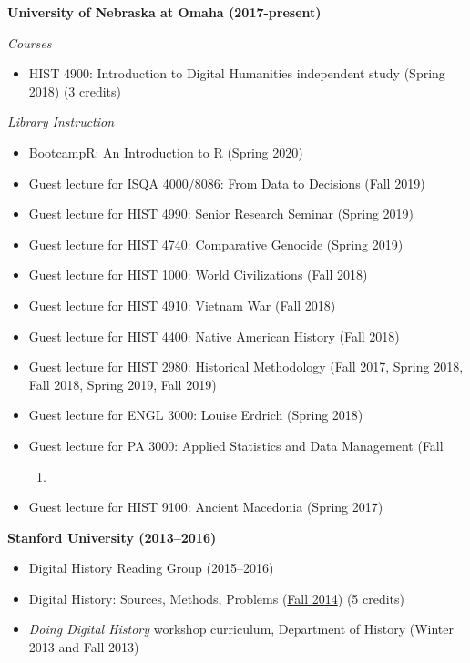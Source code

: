 \textbf{University of Nebraska at Omaha (2017-present)}

\emph{Courses}

\begin{itemize}
\tightlist
\item
  HIST 4900: Introduction to Digital Humanities independent study
  (Spring 2018) (3 credits)
\end{itemize}

\emph{Library Instruction}

\begin{itemize}
\tightlist
\item
  BootcampR: An Introduction to R (Spring 2020)
\item
  Guest lecture for ISQA 4000/8086: From Data to Decisions (Fall 2019)
\item
  Guest lecture for HIST 4990: Senior Research Seminar (Spring 2019)
\item
  Guest lecture for HIST 4740: Comparative Genocide (Spring 2019)
\item
  Guest lecture for HIST 1000: World Civilizations (Fall 2018)
\item
  Guest lecture for HIST 4910: Vietnam War (Fall 2018)
\item
  Guest lecture for HIST 4400: Native American History (Fall 2018)
\item
  Guest lecture for HIST 2980: Historical Methodology (Fall 2017, Spring
  2018, Fall 2018, Spring 2019, Fall 2019)
\item
  Guest lecture for ENGL 3000: Louise Erdrich (Spring 2018)
\item
  Guest lecture for PA 3000: Applied Statistics and Data Management
  (Fall

  \begin{enumerate}
  \def\labelenumi{\arabic{enumi})}
  \setcounter{enumi}{2016}
  \item
  \end{enumerate}
\item
  Guest lecture for HIST 9100: Ancient Macedonia (Spring 2017)
\end{itemize}

\textbf{Stanford University (2013--2016)}

\begin{itemize}
\tightlist
\item
  Digital History Reading Group (2015--2016)
\item
  Digital History: Sources, Methods, Problems
  (\href{http://jasonheppler.org/teaching/hist205f.2014/}{Fall 2014}) (5
  credits)
\item
  \emph{Doing Digital History} workshop curriculum, Department of
  History (Winter 2013 and Fall 2013)
\end{itemize}

